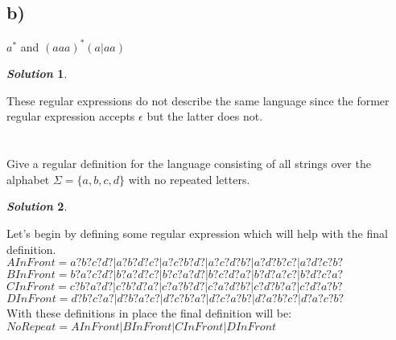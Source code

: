 \documentclass[11pt, a4paper]{article}
\newtheorem*{solution}{\emph{Solution}}
\begin{document}
	\subsection*{b)}
		$a^*$ and $(aaa)^{*}(a|aa)$
		\begin{solution}
		\end{solution}
		These regular expressions do not describe the same language since the former regular expression accepts $\epsilon$ but the latter does not.

\section{}
	Give a regular definition for the language consisting of all strings over the alphabet $\Sigma = \{a, b, c, d\}$ with no repeated letters.
	\begin{solution}
	\end{solution}
	Let's begin by defining some regular expression which will help with the final definition. \\
	$AInFront = a?b?c?d? | a?b?d?c? |a?c?b?d? | a?c?d?b? | a?d?b?c? | a?d?c?b?$\\
	$BInFront = b?a?c?d? | b?a?d?c? |b?c?a?d? | b?c?d?a? | b?d?a?c? | b?d?c?a?$\\
	$CInFront = c?b?a?d? | c?b?d?a? |c?a?b?d? | c?a?d?b? | c?d?b?a? | c?d?a?b?$\\
	$DInFront = d?b?c?a? | d?b?a?c? |d?c?b?a? | d?c?a?b? | d?a?b?c? | d?a?c?b?$\\
	With these definitions in place the final definition will be:\\
	$NoRepeat = AInFront | BInFront | CInFront | DInFront$
\end{document}
